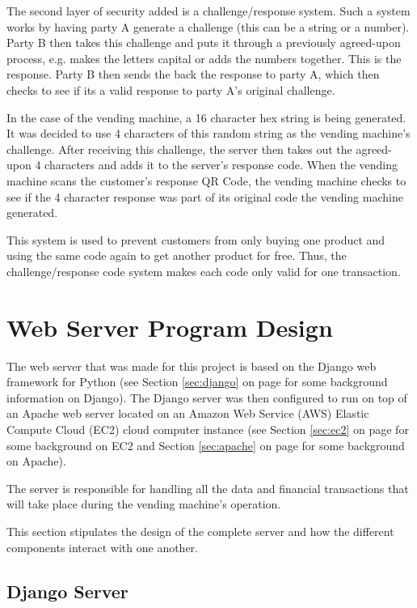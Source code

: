 The second layer of security added is a challenge/response system. Such a system
works by having party A generate a challenge (this can be a string or a number).
Party B then takes this challenge and puts it through a previously agreed-upon
process, e.g. makes the letters capital or adds the numbers together. This
is the response. Party B then sends the back the response to party A, which then
checks to see if its a valid response to party A's original challenge.

In the case of the vending machine, a 16 character hex string is being
generated. It was decided to use 4 characters of this random string as the
vending machine's challenge. After receiving this challenge, the server then
takes out the agreed-upon 4 characters and adds it to the server's response
code. When the vending machine scans the customer's response QR Code, the
vending machine checks to see if the 4 character response was part of its
original code the vending machine generated.

This system is used to prevent customers from only buying one product and using
the same code again to get another product for free. Thus, the
challenge/response code system makes each code only valid for one transaction.

\section{Web Server Program Design}

The web server that was made for this project is based on the Django web framework for Python
(see Section \ref{sec:django} on page \pageref{sec:django} for some background information
on Django).
The Django server was then configured to run on top of an Apache web server located on an Amazon Web Service (AWS) Elastic
Compute Cloud (EC2) cloud computer instance (see Section \ref{sec:ec2} on page
\pageref{sec:ec2} for some background on EC2 and Section \ref{sec:apache} on page
\pageref{sec:apache} for some background on Apache).

The server is responsible for handling all the data and financial transactions that will take
place during the vending machine's operation. 

This section stipulates the design of the complete server and how the different components
interact with one another. 

\subsection{Django Server}

